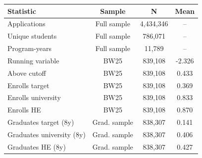 \begin{tabular}{lccc}
\toprule
Statistic & Sample & N & Mean \\
\midrule
Applications & Full sample & 4,434,346 & -- \\
Unique students & Full sample &   786,071 & -- \\
Program-years & Full sample &    11,789 & -- \\
\midrule
Running variable & BW25 &   839,108 & -2.326 \\
Above cutoff & BW25 &   839,108 &  0.433 \\
Enrolls target & BW25 &   839,108 &  0.369 \\
Enrolls university & BW25 &   839,108 &  0.833 \\
Enrolls HE & BW25 &   839,108 &  0.870 \\
\midrule
Graduates target (8y) & Grad. sample &   838,307 &  0.141 \\
Graduates university (8y) & Grad. sample &   838,307 &  0.406 \\
Graduates HE (8y) & Grad. sample &   838,307 &  0.427 \\
\bottomrule
\end{tabular}
